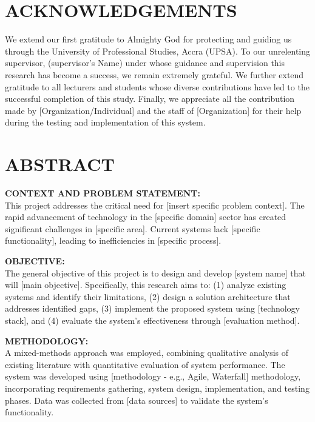 \documentclass[12pt,twoside]{report}
\begin{document}
\chapter*{ACKNOWLEDGEMENTS}
\vspace{2cm}
We extend our first gratitude to Almighty God for protecting and guiding us through the University of Professional Studies, Accra (UPSA). To our unrelenting supervisor, (supervisor's Name) under whose guidance and supervision this research has become a success, we remain extremely grateful. We further extend gratitude to all lecturers and students whose diverse contributions have led to the successful completion of this study. Finally, we appreciate all the contribution made by [Organization/Individual] and the staff of [Organization] for their help during the testing and implementation of this system.
\newpage

\chapter*{ABSTRACT}
\vspace{1cm}
\textbf{CONTEXT AND PROBLEM STATEMENT:}\\
This project addresses the critical need for [insert specific problem context]. The rapid advancement of technology in the [specific domain] sector has created significant challenges in [specific area]. Current systems lack [specific functionality], leading to inefficiencies in [specific process].

\textbf{OBJECTIVE:}\\
The general objective of this project is to design and develop [system name] that will [main objective]. Specifically, this research aims to: (1) analyze existing systems and identify their limitations, (2) design a solution architecture that addresses identified gaps, (3) implement the proposed system using [technology stack], and (4) evaluate the system's effectiveness through [evaluation method].

\textbf{METHODOLOGY:}\\
A mixed-methods approach was employed, combining qualitative analysis of existing literature with quantitative evaluation of system performance. The system was developed using [methodology - e.g., Agile, Waterfall] methodology, incorporating requirements gathering, system design, implementation, and testing phases. Data was collected from [data sources] to validate the system's functionality.
\end{document}
